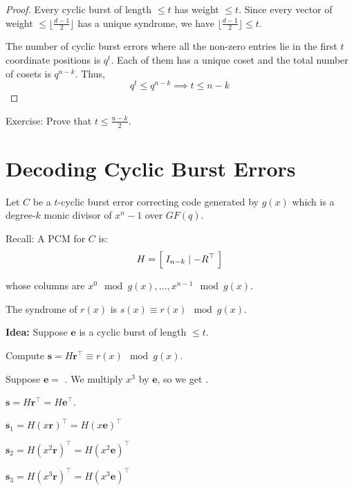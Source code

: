 \begin{proof}
    Every cyclic burst of length $ \leqslant t $ has weight $ \leqslant t $.
    Since every vector of weight $ \leqslant \lfloor \frac{d-1}{2} \rfloor $
    has a unique syndrome, we have $ \lfloor \frac{d-1}{2} \rfloor \leqslant t $.

    The number of cyclic burst errors where all the non-zero entries lie in the first
    $ t $ coordinate positions is $ q^t $. Each of them has a unique coset
    and the total number of cosets is $ q^{n-k} $. Thus,
    \[ q^t\leqslant q^{n-k}\implies t\leqslant n-k \]
\end{proof}

Exercise: Prove that $ t\leqslant \frac{n-k}{2} $.

\section{Decoding Cyclic Burst Errors}
Let $ C $ be a $ t $-cyclic burst error correcting code generated
by $ g(x) $ which is a degree-$ k $ monic divisor of $ x^n-1 $ over $ GF(q) $.

Recall: A PCM for $ C $ is:
\[ H= \Bigl[\; I_{n-k}\mid -R^\top \;\Bigr] \]

whose columns are $ x^0 \mod g(x),\ldots ,x^{n-1} \mod g(x) $.

The syndrome of $ r(x) $ is $ s(x)\equiv r(x)\mod g(x) $.

\textbf{Idea:} Suppose $ \bm{e} $ is a cyclic burst of length $ \leqslant t $.

Compute $ \bm{s}=H\bm{r}^\top\equiv r(x)\mod g(x) $.

Suppose $ \bm{e}= $  . We multiply $ x^3 $ by $ \bm{e} $,
so we get .

$ \bm{s}=H\bm{r}^\top=H\bm{e}^\top $.

$ \bm{s}_1=H(x\bm{r})^\top = H(x\bm{e})^\top $

$ \bm{s}_2=H(x^2\bm{r})^\top = H(x^2\bm{e})^\top $

$ \bm{s}_3=H(x^3\bm{r})^\top = H(x^3\bm{e})^\top $
